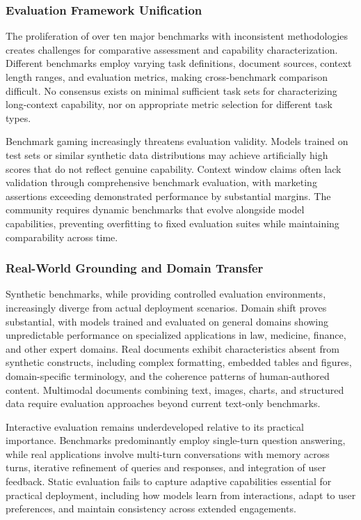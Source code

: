 \documentclass[11pt,letterpaper]{article}
\begin{document}
\subsubsection{Evaluation Framework Unification}

The proliferation of over ten major benchmarks with inconsistent methodologies creates challenges for comparative assessment and capability characterization. Different benchmarks employ varying task definitions, document sources, context length ranges, and evaluation metrics, making cross-benchmark comparison difficult. No consensus exists on minimal sufficient task sets for characterizing long-context capability, nor on appropriate metric selection for different task types.

Benchmark gaming increasingly threatens evaluation validity. Models trained on test sets or similar synthetic data distributions may achieve artificially high scores that do not reflect genuine capability. Context window claims often lack validation through comprehensive benchmark evaluation, with marketing assertions exceeding demonstrated performance by substantial margins. The community requires dynamic benchmarks that evolve alongside model capabilities, preventing overfitting to fixed evaluation suites while maintaining comparability across time.

\subsubsection{Real-World Grounding and Domain Transfer}

Synthetic benchmarks, while providing controlled evaluation environments, increasingly diverge from actual deployment scenarios. Domain shift proves substantial, with models trained and evaluated on general domains showing unpredictable performance on specialized applications in law, medicine, finance, and other expert domains. Real documents exhibit characteristics absent from synthetic constructs, including complex formatting, embedded tables and figures, domain-specific terminology, and the coherence patterns of human-authored content. Multimodal documents combining text, images, charts, and structured data require evaluation approaches beyond current text-only benchmarks.

Interactive evaluation remains underdeveloped relative to its practical importance. Benchmarks predominantly employ single-turn question answering, while real applications involve multi-turn conversations with memory across turns, iterative refinement of queries and responses, and integration of user feedback. Static evaluation fails to capture adaptive capabilities essential for practical deployment, including how models learn from interactions, adapt to user preferences, and maintain consistency across extended engagements.
\end{document}
